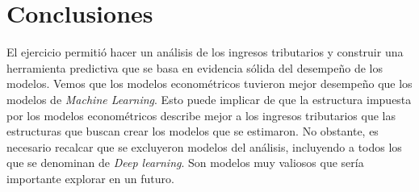 \documentclass[a4paper, 11pt]{article}
\begin{document}
\section*{Conclusiones}
El ejercicio permitió hacer un análisis de los ingresos tributarios y construir una herramienta predictiva que se basa en evidencia sólida del desempeño de los modelos. Vemos que los modelos econométricos tuvieron mejor desempeño que los modelos de \textit{Machine Learning}. Esto puede implicar de que la estructura impuesta por los modelos econométricos describe mejor a los ingresos tributarios que las estructuras que buscan crear los modelos que se estimaron. No obstante, es necesario recalcar que se excluyeron modelos del análisis, incluyendo a todos los que se denominan de \textit{Deep learning}. Son modelos muy valiosos que sería importante explorar en un futuro. 
\end{document}
